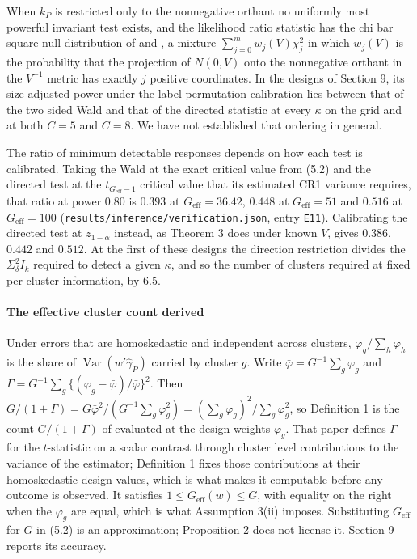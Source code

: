 \documentclass[12pt]{article}
\theoremstyle{definition}
\numberwithin{equation}{section}
\begin{document}
When $k_P$ is restricted only to the nonnegative orthant no uniformly most
powerful invariant test exists, and the likelihood ratio statistic has the
chi bar square null distribution of \citet{kudo1963} and \citet{shapiro1988},
a mixture $\sum_{j=0}^m w_j(V)\chi^2_j$ in which $w_j(V)$ is the probability
that the projection of $N(0,V)$ onto the nonnegative orthant in the $V^{-1}$
metric has exactly $j$ positive coordinates. In the designs of Section
9, its size-adjusted power under the label permutation calibration
lies between that of the two sided Wald and that of the directed statistic at
every $\kappa$ on the grid and at both $C = 5$ and $C = 8$. We have not
established that ordering in general.

The ratio of minimum detectable responses depends on how each test is
calibrated. Taking the Wald at the exact critical value from (5.2)
and the directed test at the $t_{G_{\mathrm{eff}}-1}$ critical value that its
estimated CR1 variance requires, that ratio at power $0.80$ is $0.393$ at
$G_{\mathrm{eff}} = 36.42$, $0.448$ at $G_{\mathrm{eff}} = 51$ and $0.516$ at
$G_{\mathrm{eff}} = 100$ (\texttt{results/inference/verification.json},
entry \texttt{E11}). Calibrating the directed test at $z_{1-\alpha}$ instead, as
Theorem 3 does under known $V$, gives $0.386$, $0.442$ and $0.512$.
At the first of these designs the direction restriction divides the
$\Sigma_\delta^2 I_k$ required to detect a given $\kappa$, and so the number of
clusters required at fixed per cluster information, by $6.5$.

\paragraph{The effective cluster count derived}

Under errors that are homoskedastic and independent across clusters,
$\varphi_g / \sum_h \varphi_h$ is the share of
$\operatorname{Var}(w'\hat{\gamma}_P)$ carried by cluster $g$. Write
$\bar{\varphi} = G^{-1}\sum_g \varphi_g$ and $\Gamma = G^{-1}\sum_g
\{(\varphi_g - \bar{\varphi})/\bar{\varphi}\}^2$. Then $G/(1+\Gamma) =
G\bar{\varphi}^2 / (G^{-1}\sum_g \varphi_g^2) = (\sum_g \varphi_g)^2 /
\sum_g \varphi_g^2$, so Definition 1 is the count $G/(1+\Gamma)$
of \citet{carter2017cluster} evaluated at the design weights $\varphi_g$. That
paper defines $\Gamma$ for the $t$-statistic on a scalar contrast through
cluster level contributions to the variance of the estimator; Definition
1 fixes those contributions at their homoskedastic design values,
which is what makes it computable before any outcome is observed. It satisfies
$1 \le G_{\mathrm{eff}}(w) \le G$, with equality on the right when the
$\varphi_g$ are equal, which is what Assumption 3(ii) imposes.
Substituting $G_{\mathrm{eff}}$ for $G$ in (5.2) is an
approximation; Proposition 2 does not license it. Section
9 reports its accuracy.
\end{document}
